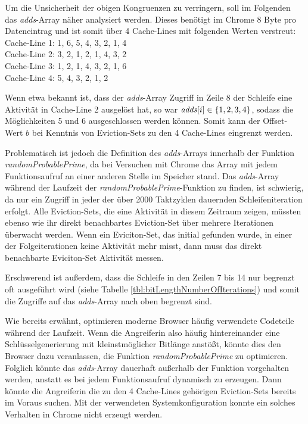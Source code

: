 Um die Unsicherheit der obigen Kongruenzen zu verringern, soll im Folgenden das \textit{adds}-Array näher analysiert werden.
Dieses benötigt im Chrome 8 Byte pro Dateneintrag und ist somit über 4 Cache-Lines mit folgenden Werten verstreut:\\
Cache-Line 1: 1, 6, 5, 4, 3, 2, 1, 4\\
Cache-Line 2: 3, 2, 1, 2, 1, 4, 3, 2\\
Cache-Line 3: 1, 2, 1, 4, 3, 2, 1, 6\\
Cache-Line 4: 5, 4, 3, 2, 1, 2

Wenn etwa bekannt ist, dass der \textit{adds}-Array Zugriff in Zeile 8 der Schleife eine Aktivität in Cache-Line 2 ausgelöst hat, so war $\text{\textit{adds}}[i] \in \{1,2,3,4\}$, sodass die Möglichkeiten 5 und 6 ausgeschlossen werden können.
Somit kann der Offset-Wert $b$ bei Kenntnis von Eviction-Sets zu den 4 Cache-Lines eingrenzt werden.

Problematisch ist jedoch die Definition des \textit{adds}-Arrays innerhalb der Funktion \textit{randomProbablePrime}, da bei Versuchen mit Chrome das Array mit jedem Funktionsaufruf an einer anderen Stelle im Speicher stand.
Das \textit{adds}-Array während der Laufzeit der \textit{randomProbablePrime}-Funktion zu finden, ist schwierig, da nur ein Zugriff in jeder der über 2000 Taktzyklen dauernden Schleifeniteration erfolgt.
Alle Eviction-Sets, die eine Aktivität in diesem Zeitraum zeigen, müssten ebenso wie ihr direkt benachbartes Eviction-Set über mehrere Iterationen überwacht werden.
Wenn ein Eviciton-Set, das initial gefunden wurde, in einer der Folgeiterationen keine Aktivität mehr misst, dann muss das direkt benachbarte Eviciton-Set Aktivität messen.

Erschwerend ist außerdem, dass die Schleife in den Zeilen 7 bis 14 nur begrenzt oft ausgeführt wird (siehe Tabelle \ref{tbl:bitLengthNumberOfIterations}) und somit die Zugriffe auf das \textit{adds}-Array nach oben begrenzt sind.

Wie bereits erwähnt, optimieren moderne Browser häufig verwendete Codeteile während der Laufzeit.
Wenn die Angreiferin also häufig hintereinander eine Schlüsselgenerierung mit kleinstmöglicher Bitlänge anstößt, könnte dies den Browser dazu veranlassen, die Funktion \textit{randomProbablePrime} zu optimieren. 
Folglich könnte das \textit{adds}-Array dauerhaft außerhalb der Funktion vorgehalten werden, anstatt es bei jedem Funktionsaufruf dynamisch zu erzeugen.
Dann könnte die Angreiferin die zu den 4 Cache-Lines gehörigen Eviction-Sets bereits im Voraus suchen.
Mit der verwendeten Systemkonfiguration konnte ein solches Verhalten in Chrome nicht erzeugt werden.

